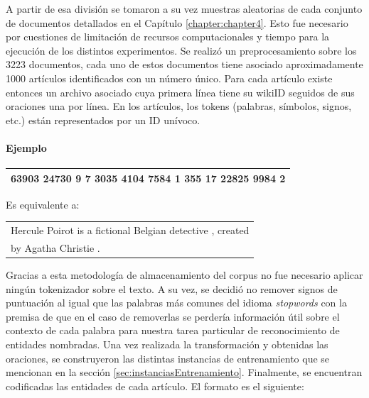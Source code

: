 A partir de esa división se tomaron a su vez muestras aleatorias de cada conjunto de documentos detallados en el Capítulo \ref{chapter:chapter4}. Esto fue necesario por cuestiones de limitación de recursos computacionales y tiempo para la ejecución de los distintos experimentos. Se realizó un preprocesamiento sobre los 3223 documentos, cada uno de estos documentos tiene asociado aproximadamente 1000 artículos identificados con un número único. Para cada artículo existe entonces un archivo asociado cuya primera línea tiene su wikiID seguidos de sus oraciones una por línea. En los artículos, los tokens (palabras, símbolos, signos, etc.) están representados por un ID unívoco.

\paragraph{Ejemplo}\hfill

\vspace{0.5em}

\begin{tabular}{|l|}
    \hline
    63903 24730 9 7 3035 4104 7584 1 355 17 22825 9984 2 \\
    \hline
\end{tabular}

\vspace{0.5em}

Es equivalente a:

\begin{tabular}{|l|}
    \hline
    Hercule Poirot is a fictional Belgian detective , created \\
    by Agatha Christie . \\
    \hline
\end{tabular}

\vspace{1em}

Gracias a esta metodología de almacenamiento del corpus no fue necesario aplicar ningún tokenizador sobre el texto. A su vez, se decidió no remover signos de puntuación al igual que las palabras más comunes del idioma \textit{stopwords} con la premisa de que en el caso de removerlas se perdería información útil sobre el contexto de cada palabra para nuestra tarea particular de reconocimiento de entidades nombradas. Una vez realizada la transformación y obtenidas las oraciones, se construyeron las distintas instancias de entrenamiento que se mencionan en la sección \ref{sec:instanciasEntrenamiento}. Finalmente, se encuentran codificadas las entidades de cada artículo. El formato es el siguiente:

